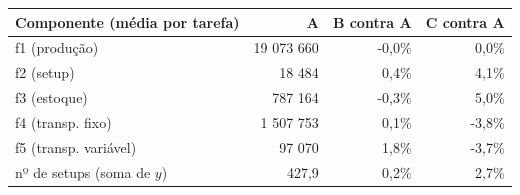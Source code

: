 \begin{tabular}{lrrr}
\toprule
Componente (média por tarefa) & A & B contra A & C contra A \\
\midrule
f1 (produção) & 19 073 660 & -0,0\% & 0,0\% \\
f2 (setup) & 18 484 & 0,4\% & 4,1\% \\
f3 (estoque) & 787 164 & -0,3\% & 5,0\% \\
f4 (transp. fixo) & 1 507 753 & 0,1\% & -3,8\% \\
f5 (transp. variável) & 97 070 & 1,8\% & -3,7\% \\
nº de setups (soma de $y$) & 427,9 & 0,2\% & 2,7\% \\
\bottomrule
\end{tabular}
